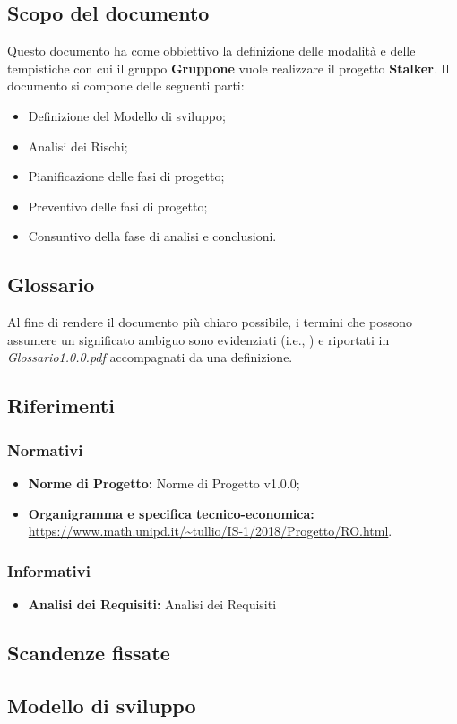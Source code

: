 \documentclass[../piano-di-progetto.tex]{subfiles}
\begin{document}
\subsection{Scopo del documento}%
\label{sub:scopo_del_documento}
Questo documento ha come obbiettivo la definizione delle modalità e delle tempistiche con cui il gruppo \textbf{Gruppone} vuole realizzare il progetto \textbf{Stalker}.
Il documento si compone delle seguenti parti:
\begin{itemize}
  \item Definizione del Modello di sviluppo;
  \item Analisi dei Rischi;
  \item Pianificazione delle fasi di progetto;
  \item Preventivo delle fasi di progetto;
  \item Consuntivo della fase di analisi e conclusioni.
\end{itemize}
\subsection{Glossario}%
\label{sub:glossario}
Al fine di rendere il documento più chiaro possibile, i termini che possono assumere un significato ambiguo sono evidenziati (i.e., ) e riportati in \textit{Glossario1.0.0.pdf} accompagnati da una definizione.
\subsection{Riferimenti}%
\label{sub:riferimenti}
\subsubsection{Normativi}%
\label{subs:normativi}
\begin{itemize}
  \item  \textbf{Norme di Progetto:} Norme di Progetto v1.0.0;
  \item  \textbf{Organigramma e specifica tecnico-economica:} \url{https://www.math.unipd.it/~tullio/IS-1/2018/Progetto/RO.html}.
\end{itemize}
\subsubsection{Informativi}
\begin{itemize}
  \item \textbf{Analisi dei Requisiti:} Analisi dei Requisiti
\end{itemize}%
\label{subs:informativi}
\subsection{Scandenze fissate}%
\label{subs:scadenze_fissate}
\subsection{Modello di sviluppo}%
\label{sub:modello_di_sviluppo}
\end{document}
